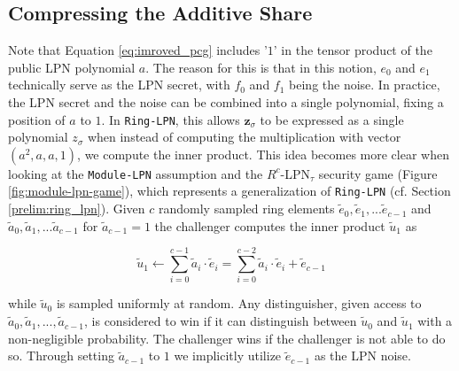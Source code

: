 \subsection{Compressing the Additive Share}
Note that Equation \ref{eq:imroved_pcg} includes '$1$' in the tensor product of the public LPN polynomial $a$. The reason for this is that in this notion, $e_0$ and $e_1$ technically serve as the LPN secret, with $f_0$ and $f_1$ being the noise. In practice, the LPN secret and the noise can be combined into a single polynomial, fixing a position of $a$ to $1$. In \texttt{Ring-LPN}, this allows $\mathbf{z}_\sigma$ to be expressed as a single polynomial $z_\sigma$ when instead of computing the multiplication with vector $(a^2, a, a, 1)$, we compute the inner product. This idea becomes more clear when looking at the \texttt{Module-LPN} assumption and the $R^{c}$-LPN$_{\tau}$ security game (Figure \ref{fig:module-lpn-game}), which represents a generalization of \texttt{Ring-LPN} (cf. Section \ref{prelim:ring_lpn}). Given $c$ randomly sampled ring elements $\tilde{e}_0, \tilde{e}_1, ... \tilde{e}_{c-1}$ and $\tilde{a}_0, \tilde{a}_1, ...\tilde{a}_{c-1}$ for $\tilde{a}_{c-1}=1$  the challenger computes the inner product $\tilde{u}_1$ as

\begin{equation}
\label{eq:inner_product_with_a_1}
\tilde{u}_{1} \leftarrow \sum_{i=0}^{c-1} \tilde{a}_{i} \cdot \tilde{e}_{i} = \sum_{i=0}^{c-2} \tilde{a}_{i} \cdot \tilde{e}_{i} + \tilde{e}_{c-1}
\end{equation}

while $\tilde{u}_0$ is sampled uniformly at random. Any distinguisher, given access to $\tilde{a}_0, \tilde{a}_1, ..., \tilde{a}_{c-1}$, is considered to win if it can distinguish between $\tilde{u}_0$ and $\tilde{u}_1$ with a non-negligible probability. The challenger wins if the challenger is not able to do so. Through setting $\tilde{a}_{c-1}$ to $1$ we implicitly utilize $\tilde{e}_{c-1}$ as the LPN noise.

